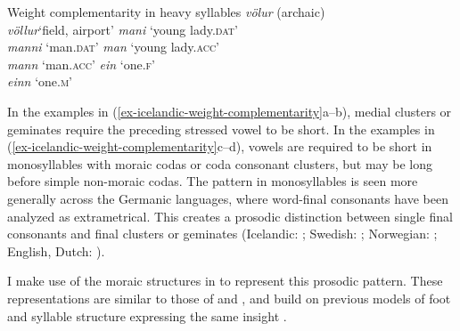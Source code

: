 \documentclass[output=paper,colorlinks,citecolor=brown]{langscibook}
\begin{document}
\ea Weight complementarity in heavy syllables \citep{garnes1976,arnason2011}\label{ex-icelandic-weight-complementarity}
\ea  \textit{völur}	 	\tab  {} (archaic) \\
     \textit{völlur}	\tab  `field, airport'
\ex  \textit{mani}	\tab  [ˈmaː.ni]	\tab  `young lady.\textsc{dat}'	\\
     \textit{manni}	\tab  [ˈman.ni] \tab  `man.\textsc{dat}' 
\ex  \textit{man}	\tab  [maːn]	\tab  `young lady.\textsc{acc}'	\\
     \textit{mann}	\tab  [manː] 	\tab  `man.\textsc{acc}' 
\ex  \textit{ein}	\tab  [eiːn] 	\tab  `one.\textsc{f}'		\\
     \textit{einn}	\tab  [eitn̥]	\tab  `one.\textsc{m}' 
\z
\z

In the examples in (\ref{ex-icelandic-weight-complementarity}a--b), medial clusters or geminates require the preceding stressed vowel to be short. In the examples in (\ref{ex-icelandic-weight-complementarity}c--d), vowels are required to be short in monosyllables with moraic codas or coda consonant clusters, but may be long before simple non-moraic codas. The pattern in monosyllables is seen more generally across the Germanic languages, where word-final consonants have been analyzed as extrametrical. This creates a prosodic distinction between single final consonants and final clusters or geminates (Icelandic: \citealp{iversonkesterson1989}; Swedish: \citealp{riad2014}; Norwegian: \citealp{kristoffersen2000}; English, Dutch: \citealp{kager1989}). 

I make use of the moraic structures in  to represent this prosodic pattern. These representations are similar to those of \citet{ringen1999} and \citet{moren2001}, and build on previous models of foot and syllable structure expressing the same insight \citep[e.g.,][]{iversonkesterson1989,arnason2011}.
\end{document}
